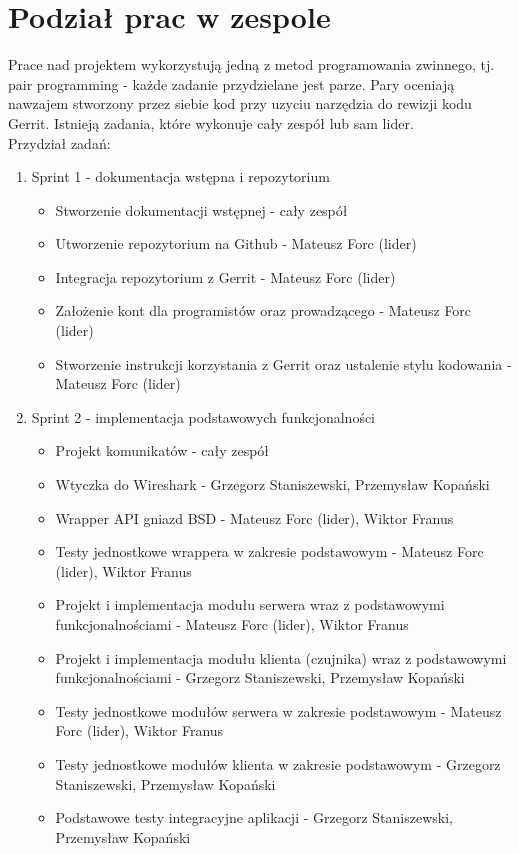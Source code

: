\documentclass[a4paper,11pt]{article}
\begin{document}
\section{Podział prac w zespole}
Prace nad projektem wykorzystują jedną z metod programowania zwinnego, tj. pair programming - każde zadanie przydzielane jest parze. Pary oceniają nawzajem stworzony przez siebie kod przy uzyciu narzędzia do rewizji kodu Gerrit. Istnieją zadania, które wykonuje cały zespół lub sam lider. \\
Przydział zadań:
\begin{enumerate}
\item Sprint 1 - dokumentacja wstępna i repozytorium
\begin{itemize}
\item Stworzenie dokumentacji wstępnej - cały zespół
\item Utworzenie repozytorium na Github - Mateusz Forc (lider)
\item Integracja repozytorium z Gerrit - Mateusz Forc (lider)
\item Założenie kont dla programistów oraz prowadzącego - Mateusz Forc (lider)
\item Stworzenie instrukcji korzystania z Gerrit oraz ustalenie stylu kodowania - Mateusz Forc (lider)
\end{itemize}
\item Sprint 2 - implementacja podstawowych funkcjonalności
\begin{itemize}
\item Projekt komunikatów - cały zespół
\item Wtyczka do Wireshark - Grzegorz Staniszewski, Przemysław Kopański
\item Wrapper API gniazd BSD - Mateusz Forc (lider), Wiktor Franus
\item Testy jednostkowe wrappera w zakresie podstawowym - Mateusz Forc (lider), Wiktor Franus
\item Projekt i implementacja modułu serwera wraz z podstawowymi funkcjonalnościami - Mateusz Forc (lider), Wiktor Franus
\item Projekt i implementacja modułu klienta (czujnika) wraz z podstawowymi funkcjonalnościami - Grzegorz Staniszewski, Przemysław Kopański
\item Testy jednostkowe modułów serwera w zakresie podstawowym - Mateusz Forc (lider), Wiktor Franus
\item Testy jednostkowe modułów klienta w zakresie podstawowym - Grzegorz Staniszewski, Przemysław Kopański
\item Podstawowe testy integracyjne aplikacji - Grzegorz Staniszewski, Przemysław Kopański

\end{itemize}
\end{enumerate}
\end{document}

